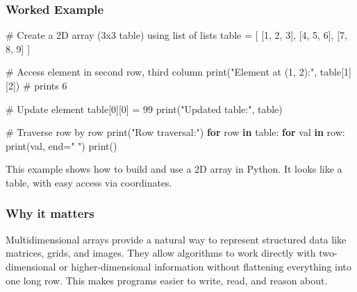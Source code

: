 \documentclass[
  letterpaper,
  DIV=11,
  numbers=noendperiod]{scrreprt}
\newenvironment{Shaded}{\begin{snugshade}}{\end{snugshade}}
\newcommand{\BuiltInTok}[1]{\textcolor[rgb]{0.00,0.23,0.31}{#1}}
\newcommand{\CommentTok}[1]{\textcolor[rgb]{0.37,0.37,0.37}{#1}}
\newcommand{\ControlFlowTok}[1]{\textcolor[rgb]{0.00,0.23,0.31}{\textbf{#1}}}
\newcommand{\DecValTok}[1]{\textcolor[rgb]{0.68,0.00,0.00}{#1}}
\newcommand{\KeywordTok}[1]{\textcolor[rgb]{0.00,0.23,0.31}{\textbf{#1}}}
\newcommand{\NormalTok}[1]{\textcolor[rgb]{0.00,0.23,0.31}{#1}}
\newcommand{\OperatorTok}[1]{\textcolor[rgb]{0.37,0.37,0.37}{#1}}
\newcommand{\StringTok}[1]{\textcolor[rgb]{0.13,0.47,0.30}{#1}}
\begin{document}
\subsubsection{Worked Example}\label{worked-example-6}

\begin{Shaded}
\begin{Highlighting}[]
\CommentTok{\# Create a 2D array (3x3 table) using list of lists}
\NormalTok{table }\OperatorTok{=}\NormalTok{ [}
\NormalTok{    [}\DecValTok{1}\NormalTok{, }\DecValTok{2}\NormalTok{, }\DecValTok{3}\NormalTok{],}
\NormalTok{    [}\DecValTok{4}\NormalTok{, }\DecValTok{5}\NormalTok{, }\DecValTok{6}\NormalTok{],}
\NormalTok{    [}\DecValTok{7}\NormalTok{, }\DecValTok{8}\NormalTok{, }\DecValTok{9}\NormalTok{]}
\NormalTok{]}

\CommentTok{\# Access element in second row, third column}
\BuiltInTok{print}\NormalTok{(}\StringTok{"Element at (1, 2):"}\NormalTok{, table[}\DecValTok{1}\NormalTok{][}\DecValTok{2}\NormalTok{])  }\CommentTok{\# prints 6}

\CommentTok{\# Update element}
\NormalTok{table[}\DecValTok{0}\NormalTok{][}\DecValTok{0}\NormalTok{] }\OperatorTok{=} \DecValTok{99}
\BuiltInTok{print}\NormalTok{(}\StringTok{"Updated table:"}\NormalTok{, table)}

\CommentTok{\# Traverse row by row}
\BuiltInTok{print}\NormalTok{(}\StringTok{"Row traversal:"}\NormalTok{)}
\ControlFlowTok{for}\NormalTok{ row }\KeywordTok{in}\NormalTok{ table:}
    \ControlFlowTok{for}\NormalTok{ val }\KeywordTok{in}\NormalTok{ row:}
        \BuiltInTok{print}\NormalTok{(val, end}\OperatorTok{=}\StringTok{" "}\NormalTok{)}
    \BuiltInTok{print}\NormalTok{()}
\end{Highlighting}
\end{Shaded}

This example shows how to build and use a 2D array in Python. It looks
like a table, with easy access via coordinates.

\subsubsection{Why it matters}\label{why-it-matters-21}

Multidimensional arrays provide a natural way to represent structured
data like matrices, grids, and images. They allow algorithms to work
directly with two-dimensional or higher-dimensional information without
flattening everything into one long row. This makes programs easier to
write, read, and reason about.
\end{document}
